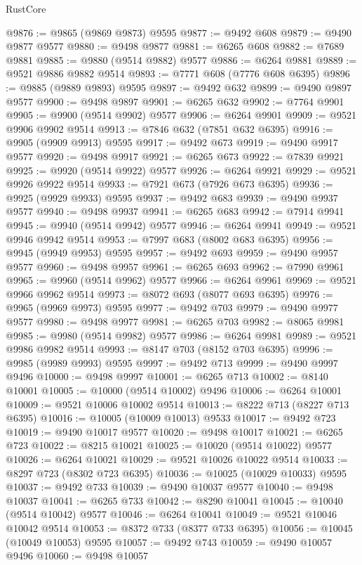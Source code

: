 \begin{lexlean}{RustCore}
\begin{coremodule}
@9876 := @9865 (@9869 @9873) @9595
@9877 := @9492 @608
@9879 := @9490 @9877 @9577
@9880 := @9498 @9877
@9881 := @6265 @608
@9882 := @7689 @9881
@9885 := @9880 (@9514 @9882) @9577
@9886 := @6264 @9881
@9889 := @9521 @9886 @9882 @9514
@9893 := @7771 @608 (@7776 @608 @6395)
@9896 := @9885 (@9889 @9893) @9595
@9897 := @9492 @632
@9899 := @9490 @9897 @9577
@9900 := @9498 @9897
@9901 := @6265 @632
@9902 := @7764 @9901
@9905 := @9900 (@9514 @9902) @9577
@9906 := @6264 @9901
@9909 := @9521 @9906 @9902 @9514
@9913 := @7846 @632 (@7851 @632 @6395)
@9916 := @9905 (@9909 @9913) @9595
@9917 := @9492 @673
@9919 := @9490 @9917 @9577
@9920 := @9498 @9917
@9921 := @6265 @673
@9922 := @7839 @9921
@9925 := @9920 (@9514 @9922) @9577
@9926 := @6264 @9921
@9929 := @9521 @9926 @9922 @9514
@9933 := @7921 @673 (@7926 @673 @6395)
@9936 := @9925 (@9929 @9933) @9595
@9937 := @9492 @683
@9939 := @9490 @9937 @9577
@9940 := @9498 @9937
@9941 := @6265 @683
@9942 := @7914 @9941
@9945 := @9940 (@9514 @9942) @9577
@9946 := @6264 @9941
@9949 := @9521 @9946 @9942 @9514
@9953 := @7997 @683 (@8002 @683 @6395)
@9956 := @9945 (@9949 @9953) @9595
@9957 := @9492 @693
@9959 := @9490 @9957 @9577
@9960 := @9498 @9957
@9961 := @6265 @693
@9962 := @7990 @9961
@9965 := @9960 (@9514 @9962) @9577
@9966 := @6264 @9961
@9969 := @9521 @9966 @9962 @9514
@9973 := @8072 @693 (@8077 @693 @6395)
@9976 := @9965 (@9969 @9973) @9595
@9977 := @9492 @703
@9979 := @9490 @9977 @9577
@9980 := @9498 @9977
@9981 := @6265 @703
@9982 := @8065 @9981
@9985 := @9980 (@9514 @9982) @9577
@9986 := @6264 @9981
@9989 := @9521 @9986 @9982 @9514
@9993 := @8147 @703 (@8152 @703 @6395)
@9996 := @9985 (@9989 @9993) @9595
@9997 := @9492 @713
@9999 := @9490 @9997 @9496
@10000 := @9498 @9997
@10001 := @6265 @713
@10002 := @8140 @10001
@10005 := @10000 (@9514 @10002) @9496
@10006 := @6264 @10001
@10009 := @9521 @10006 @10002 @9514
@10013 := @8222 @713 (@8227 @713 @6395)
@10016 := @10005 (@10009 @10013) @9533
@10017 := @9492 @723
@10019 := @9490 @10017 @9577
@10020 := @9498 @10017
@10021 := @6265 @723
@10022 := @8215 @10021
@10025 := @10020 (@9514 @10022) @9577
@10026 := @6264 @10021
@10029 := @9521 @10026 @10022 @9514
@10033 := @8297 @723 (@8302 @723 @6395)
@10036 := @10025 (@10029 @10033) @9595
@10037 := @9492 @733
@10039 := @9490 @10037 @9577
@10040 := @9498 @10037
@10041 := @6265 @733
@10042 := @8290 @10041
@10045 := @10040 (@9514 @10042) @9577
@10046 := @6264 @10041
@10049 := @9521 @10046 @10042 @9514
@10053 := @8372 @733 (@8377 @733 @6395)
@10056 := @10045 (@10049 @10053) @9595
@10057 := @9492 @743
@10059 := @9490 @10057 @9496
@10060 := @9498 @10057

\end{coremodule}
\end{lexlean}
